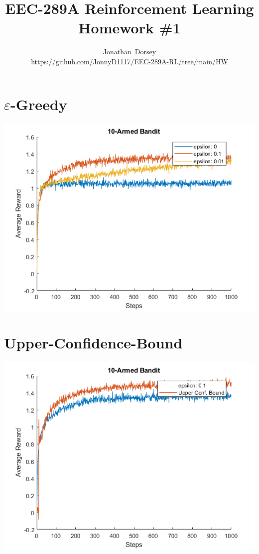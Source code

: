 \documentclass[12pt]{article}
\begin{document}
\title{ EEC-289A Reinforcement Learning \\ Homework \#1 }


\author{Jonathan~Dorsey \\\url{https://github.com/JonnyD1117/EEC-289A-RL/tree/main/HW}}
\maketitle




\section{ $\varepsilon$-Greedy}


\includegraphics{epsilon_greedy}




\section{Upper-Confidence-Bound}


\includegraphics{upper_conf_bound}
\end{document}
